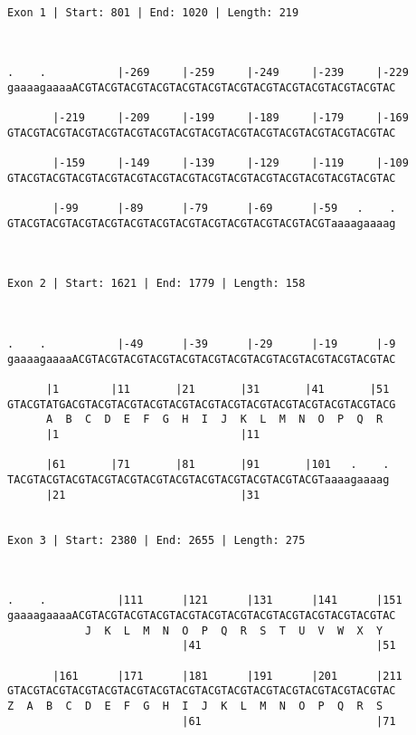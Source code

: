 \documentclass{article}
\begin{document}
 \begin{Verbatim}
 
Exon 1 | Start: 801 | End: 1020 | Length: 219



.    .           |-269     |-259     |-249     |-239     |-229
gaaaagaaaaACGTACGTACGTACGTACGTACGTACGTACGTACGTACGTACGTACGTAC
                                                            
       |-219     |-209     |-199     |-189     |-179     |-169
GTACGTACGTACGTACGTACGTACGTACGTACGTACGTACGTACGTACGTACGTACGTAC
                                                            
       |-159     |-149     |-139     |-129     |-119     |-109
GTACGTACGTACGTACGTACGTACGTACGTACGTACGTACGTACGTACGTACGTACGTAC
                                                            
       |-99      |-89      |-79      |-69      |-59   .    .
GTACGTACGTACGTACGTACGTACGTACGTACGTACGTACGTACGTACGTaaaagaaaag
                                                            
                                                            
 
Exon 2 | Start: 1621 | End: 1779 | Length: 158



.    .           |-49      |-39      |-29      |-19      |-9
gaaaagaaaaACGTACGTACGTACGTACGTACGTACGTACGTACGTACGTACGTACGTAC
                                                            
      |1        |11       |21       |31       |41       |51 
GTACGTATGACGTACGTACGTACGTACGTACGTACGTACGTACGTACGTACGTACGTACG
      A  B  C  D  E  F  G  H  I  J  K  L  M  N  O  P  Q  R  
      |1                            |11                     
  
      |61       |71       |81       |91       |101   .    .
TACGTACGTACGTACGTACGTACGTACGTACGTACGTACGTACGTACGTaaaagaaaag
      |21                           |31                    
  
 
Exon 3 | Start: 2380 | End: 2655 | Length: 275



.    .           |111      |121      |131      |141      |151
gaaaagaaaaACGTACGTACGTACGTACGTACGTACGTACGTACGTACGTACGTACGTAC
            J  K  L  M  N  O  P  Q  R  S  T  U  V  W  X  Y  
                           |41                           |51
  
       |161      |171      |181      |191      |201      |211
GTACGTACGTACGTACGTACGTACGTACGTACGTACGTACGTACGTACGTACGTACGTAC
Z  A  B  C  D  E  F  G  H  I  J  K  L  M  N  O  P  Q  R  S  
                           |61                           |71
  

\end{Verbatim}
\end{document}
